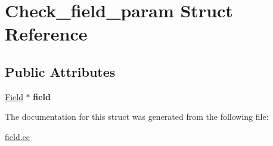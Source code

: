 \hypertarget{structCheck__field__param}{}\section{Check\+\_\+field\+\_\+param Struct Reference}
\label{structCheck__field__param}
\subsection*{Public Attributes}
\begin{DoxyCompactItemize}
\item 
\mbox{\label{structCheck__field__param_a9c283d03b040b53149f258a893dbb4ff}} 
\mbox{\hyperlink{classField}{Field}} $\ast$ {\bfseries field}
\end{DoxyCompactItemize}


The documentation for this struct was generated from the following file\+:\begin{DoxyCompactItemize}
\item 
\mbox{\hyperlink{field_8cc}{field.\+cc}}\end{DoxyCompactItemize}
